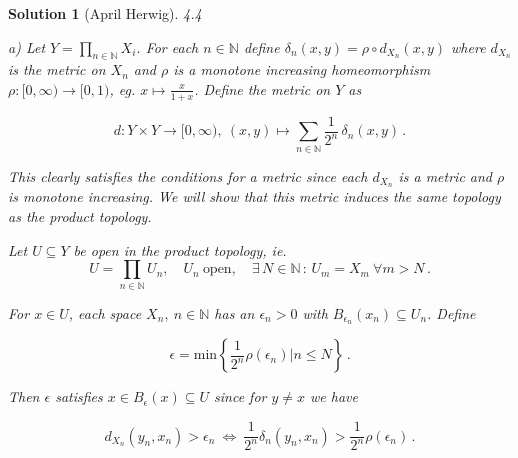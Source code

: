 \documentclass{article}                                                        %
\newtheorem{loesung}{Solution}                                                 %
\begin{document}
\begin{loesung}                                                                %
  [April Herwig]%
  {4.4}%

  \textit{a)} Let $Y = \prod\limits_{n\in\mathbb{N}} X_i$. For each 
  $n\in\mathbb{N}$ define $\delta_n (x,y) = \rho \circ d_{X_n} (x,y)$ where
  $d_{X_n}$ is the metric on $X_n$ and $\rho$ is a monotone increasing 
  homeomorphism $\rho : [0,\infty) \rightarrow [0,1)$, eg. 
  $x \mapsto \frac{x}{1+x}$. Define the metric on $Y$ as 

  \begin{equation*}
    d : Y \times Y \rightarrow [0,\infty),\ 
    (x,y) \mapsto \sum\limits_{n\in\mathbb{N}}\frac{1}{2^n}\,\delta_n (x,y)\,.
  \end{equation*}

  This clearly satisfies the conditions for a metric since each $d_{X_n}$ is a 
  metric and $\rho$ is monotone increasing. We will show that this metric
  induces the same topology as the product topology.

  Let $U \subseteq Y$ be open in the product topology, ie. 
  \begin{equation*}
    U = \prod\limits_{n\in\mathbb{N}} U_n,\quad 
    U_n\ \text{open},\quad 
    \exists\, N\in\mathbb{N}\,:\, U_m = X_m\ \forall m > N\,.
  \end{equation*}

  For $x\in U$, each space $X_n,\ n\in\mathbb{N}$ has an $\epsilon_n > 0$ with
  $B_{\epsilon_n} (x_n) \subseteq U_n$. Define 

  \begin{equation*}
    \epsilon = \text{min}
    \left\{
      \frac{1}{2^n}\rho(\epsilon_n) \vert n \leq N
    \right\}\,.
  \end{equation*}
  
  Then $\epsilon$ satisfies $x \in B_\epsilon (x) \subseteq U$ since for 
  $y \neq x$ we have

  \begin{equation*}
    d_{X_n} (y_n,x_n) > \epsilon_n \ \Leftrightarrow \ 
    \frac{1}{2^n}\delta_n (y_n,x_n) > \frac{1}{2^n}\rho(\epsilon_n)\,.
  \end{equation*}


\end{loesung}
\end{document}
